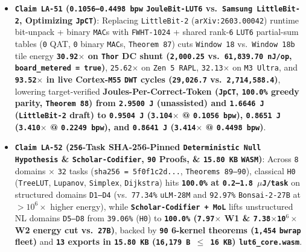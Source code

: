 \documentclass[10pt]{article}
\begin{document}
\begin{itemize}
  \item \textbf{\texttt{Claim LA-51} (\texttt{0.1056--0.4498 bpw} \texttt{JouleBit-LUT6} vs.\ \texttt{Samsung LittleBit-2}, Optimizing \texttt{JpCT})}: Replacing \texttt{LittleBit-2} (\texttt{arXiv:2603.00042}) runtime bit-unpack + binary \texttt{MAC}s with \texttt{FWHT-1024} + shared rank-\texttt{6} \texttt{LUT6} partial-sum tables (\texttt{0} QAT, \texttt{0} binary \texttt{MAC}s, \texttt{Theorem 87}) cuts \texttt{Window 18} vs.\ \texttt{Window 18b} tile energy \textbf{\texttt{30.92$\times$} on \texttt{Thor} DC shunt (\texttt{2,000.25} vs.\ \texttt{61,839.70 nJ/op}, \texttt{board\_metered = true})}, \texttt{25.62$\times$} on \texttt{Zen 5 RAPL}, \texttt{32.13$\times$} on \texttt{M3 Ultra}, and \textbf{\texttt{93.52$\times$} in live Cortex-\texttt{M55} \texttt{DWT} cycles (\texttt{29,026.7} vs.\ \texttt{2,714,588.4})}, lowering target-verified \textbf{Joules-Per-Correct-Token (\texttt{JpCT}, \texttt{100.0\%} greedy parity, \texttt{Theorem 88}) from \texttt{2.9500 J} (unassisted) and \texttt{1.6646 J} (\texttt{LittleBit-2} draft) to \texttt{0.9504 J} (\texttt{3.104$\times$} @ \texttt{0.1056 bpw}), \texttt{0.8651 J} (\texttt{3.410$\times$} @ \texttt{0.2249 bpw}), and \texttt{0.8641 J} (\texttt{3.414$\times$} @ \texttt{0.4498 bpw})}.
  \item \textbf{\texttt{Claim LA-52} (\texttt{256}-Task SHA-256-Pinned \texttt{Deterministic Null Hypothesis} \& \texttt{Scholar-Codifier}, \texttt{90} Proofs, \& \texttt{15.80 KB} \texttt{WASM})}: Across \texttt{8} domains $\times$ \texttt{32} tasks (\texttt{sha256 = 5f0f1c2d...}, \texttt{Theorems 89--90}), classical \texttt{H0} (\texttt{TreeLUT}, \texttt{Lupanov}, \texttt{Simplex}, \texttt{Dijkstra}) hits \textbf{\texttt{100.0\%} at \texttt{0.2--1.8 $\mu$J/task}} on structured domains \texttt{D1--D4} (vs.\ \texttt{77.34\%} \texttt{uLM-28M} and \texttt{92.97\%} \texttt{Bonsai-2-27B} at $> 10^6\times$ higher energy), while \textbf{\texttt{Scholar-Codifier + MoL}} lifts unstructured NL domains \texttt{D5--D8} from \texttt{39.06\%} (\texttt{H0}) to \textbf{\texttt{100.0\%} (\texttt{7.97$\times$} W1 \& \texttt{7.38$\times$10$^6\times$} W2 energy cut vs.\ \texttt{27B})}, backed by \textbf{\texttt{90} 6-kernel theorems (\texttt{1,454} \texttt{bwrap} fleet)} and \textbf{\texttt{13} exports in \texttt{15.80 KB} (\texttt{16,179 B $\le$ 16 KB}) \texttt{lut6\_core.wasm}}.
\end{itemize}
\end{document}
